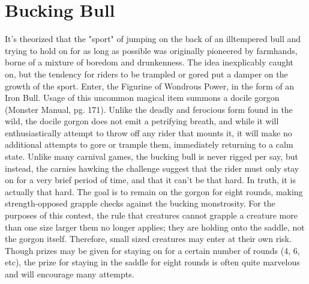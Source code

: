 \documentclass[10pt,a4paper,twoside,twocolumn,openany,bg=print,nodeprecatedcode]{dndbook}
\begin{document}
\section{Bucking Bull}
It's theorized that the "sport" of jumping on the back of an illtempered bull and trying to hold on for as long as possible was originally pioneered by farmhands, borne of a mixture of boredom and drunkenness. The idea inexplicably caught on, but the tendency for riders to be trampled or gored put a damper on the growth of the sport.
Enter, the Figurine of Wondrous Power, in the form of an Iron Bull. Usage of this uncommon magical item summons a docile gorgon (Monster Manual, pg. 171). Unlike the deadly and ferocious form found in the wild, the docile gorgon does not emit a petrifying breath, and while it will enthusiastically attempt to throw off any rider that mounts it, it will make no additional attempts to gore or trample them, immediately returning to a calm state.
Unlike many carnival games, the bucking bull is never rigged per say, but instead, the carnies hawking the challenge suggest that the rider must only stay on for a very brief period of time, and that it can't be that hard. In truth, it is actually that hard.
The goal is to remain on the gorgon for eight rounds, making strength-opposed grapple checks against the bucking monstrosity. For the purposes of this contest, the rule that creatures cannot grapple a creature more than one size larger them no longer applies; they are holding onto the saddle, not the gorgon itself. Therefore, small sized creatures may enter at their own risk.
Though prizes may be given for staying on for a certain number of rounds (4, 6, etc), the prize for staying in the saddle for eight rounds is often quite marvelous and will encourage many attempts.
\end{document}

